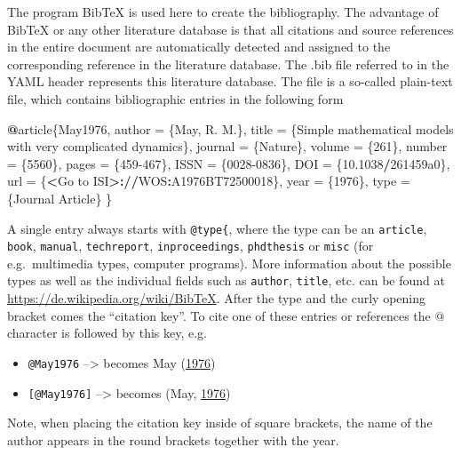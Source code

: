 \documentclass[a4paper,12pt]{article}
\providecommand{\tightlist}{%
  \setlength{\itemsep}{0pt}\setlength{\parskip}{0pt}}
\newenvironment{Shaded}{\begin{snugshade}}{\end{snugshade}}
\newcommand{\DecValTok}[1]{\textcolor[rgb]{0.00,0.00,0.81}{#1}}
\newcommand{\ErrorTok}[1]{\textcolor[rgb]{0.64,0.00,0.00}{\textbf{#1}}}
\newcommand{\FloatTok}[1]{\textcolor[rgb]{0.00,0.00,0.81}{#1}}
\newcommand{\NormalTok}[1]{#1}
\newcommand{\OperatorTok}[1]{\textcolor[rgb]{0.81,0.36,0.00}{\textbf{#1}}}
\newcommand{\StringTok}[1]{\textcolor[rgb]{0.31,0.60,0.02}{#1}}
\begin{document}
The program BibTeX is used here to create the bibliography. The advantage of BibTeX or any other literature database is that all citations and source references in the entire document are automatically detected and assigned to the corresponding reference in the literature database. The .bib file referred to in the YAML header represents this literature database. The file is a so-called plain-text file, which contains bibliographic entries in the following form
\begin{Shaded}
\begin{Highlighting}[]
\OperatorTok{@}\NormalTok{article\{May1976,}
\NormalTok{   author =}\StringTok{ }\NormalTok{\{May, R. M.\},}
\NormalTok{   title =}\StringTok{ }\NormalTok{\{Simple mathematical models with very }
\NormalTok{     complicated dynamics\},}
\NormalTok{   journal =}\StringTok{ }\NormalTok{\{Nature\},}
\NormalTok{   volume =}\StringTok{ }\NormalTok{\{}\DecValTok{261}\NormalTok{\},}
\NormalTok{   number =}\StringTok{ }\NormalTok{\{}\DecValTok{5560}\NormalTok{\},}
\NormalTok{   pages =}\StringTok{ }\NormalTok{\{}\DecValTok{459-467}\NormalTok{\},}
\NormalTok{   ISSN =}\StringTok{ }\NormalTok{\{}\DecValTok{0028-0836}\NormalTok{\},}
\NormalTok{   DOI =}\StringTok{ }\NormalTok{\{}\FloatTok{10.1038}\OperatorTok{/}\NormalTok{261459a0\},}
\NormalTok{   url =}\StringTok{ }\NormalTok{\{}\OperatorTok{<}\NormalTok{Go to ISI}\OperatorTok{>}\ErrorTok{://}\NormalTok{WOS}\OperatorTok{:}\NormalTok{A1976BT72500018\},}
\NormalTok{   year =}\StringTok{ }\NormalTok{\{}\DecValTok{1976}\NormalTok{\},}
\NormalTok{   type =}\StringTok{ }\NormalTok{\{Journal Article\}}
\NormalTok{\}}
\end{Highlighting}
\end{Shaded}
A single entry always starts with \texttt{@type\{}, where the type can be an \texttt{article}, \texttt{book}, \texttt{manual}, \texttt{techreport}, \texttt{inproceedings}, \texttt{phdthesis} or \texttt{misc} (for e.g.~multimedia types, computer programs). More information about the possible types as well as the individual fields such as \texttt{author}, \texttt{title}, etc. can be found at \url{https://de.wikipedia.org/wiki/BibTeX}. After the type and the curly opening bracket comes the \enquote{citation key}. To cite one of these entries or references the @ character is followed by this key, e.g.
\begin{itemize}
\tightlist
\item
  \texttt{@May1976} --\textgreater{} becomes May (\protect\hyperlink{ref-May1976}{1976})
\item
  \texttt{{[}@May1976{]}} --\textgreater{} becomes (May, \protect\hyperlink{ref-May1976}{1976})
\end{itemize}
Note, when placing the citation key inside of square brackets, the name of the author appears in the round brackets together with the year.
\end{document}
